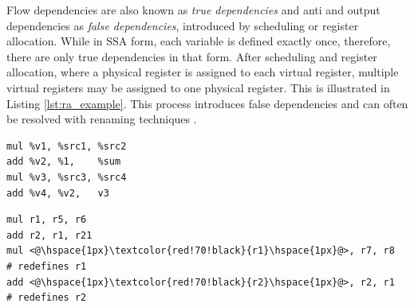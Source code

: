 Flow dependencies are also known as \emph{true dependencies} and anti and output dependencies as \emph{false dependencies}, introduced by scheduling or register allocation. While in SSA form, each variable is defined exactly once, therefore, there are only true dependencies in that form. After scheduling and register allocation, where a physical register is assigned to each virtual register, multiple virtual registers may be assigned to one physical register. This is illustrated in Listing \ref{lst:ra_example}. This process introduces false dependencies and can often be resolved with renaming techniques \cite{tta_codegen,renaming}.

\begin{center}
\hspace{2px}\begin{minipage}[t]{.475\textwidth}
\begin{lstlisting}[frame=tlrb]
mul %v1, %src1, %src2
add %v2, %1,    %sum
mul %v3, %src3, %src4
add %v4, %v2,   v3
\end{lstlisting}
\end{minipage}\hfill
\begin{minipage}[t]{.475\textwidth}
\begin{lstlisting}[frame=tlrb]
mul r1, r5, r6
add r2, r1, r21
mul <@\hspace{1px}\textcolor{red!70!black}{r1}\hspace{1px}@>, r7, r8  # redefines r1
add <@\hspace{1px}\textcolor{red!70!black}{r2}\hspace{1px}@>, r2, r1  # redefines r2
\end{lstlisting}
\end{minipage}
\label{lst:ra_example}
\end{center}

